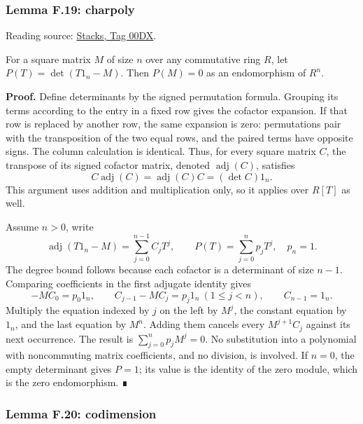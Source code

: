 \documentclass[11pt,a4paper,openany]{report}
\begin{document}
\label{AG-RG-S05-algebra-lemma-charpoly}

\subsubsection{Lemma F.19: charpoly}\label{AG-RG-S05-lemma-f.19-charpoly}

Reading source: \href{https://stacks.math.columbia.edu/tag/00DX}{Stacks, Tag 00DX}.

For a square matrix \(M\) of size \(n\) over any commutative ring \(R\), let \(P(T)=\det(T1_n-M)\). Then \(P(M)=0\) as an endomorphism of \(R^n\).

\textbf{Proof.} Define determinants by the signed permutation formula. Grouping its terms according to the entry in a fixed row gives the cofactor expansion. If that row is replaced by another row, the same expansion is zero: permutations pair with the transposition of the two equal rows, and the paired terms have opposite signs. The column calculation is identical. Thus, for every square matrix \(C\), the transpose of its signed cofactor matrix, denoted \(\operatorname{adj}(C)\), satisfies \[
C\operatorname{adj}(C)=\operatorname{adj}(C)C=(\det C)1_n.
\] This argument uses addition and multiplication only, so it applies over \(R[T]\) as well.

Assume \(n>0\), write \[
\operatorname{adj}(T1_n-M)=\sum_{j=0}^{n-1}C_jT^j,
\qquad P(T)=\sum_{j=0}^n p_jT^j,\quad p_n=1.
\] The degree bound follows because each cofactor is a determinant of size \(n-1\). Comparing coefficients in the first adjugate identity gives \[
-MC_0=p_0 1_n,\qquad
C_{j-1}-MC_j=p_j1_n\ (1\leq j<n),\qquad C_{n-1}=1_n.
\] Multiply the equation indexed by \(j\) on the left by \(M^j\), the constant equation by \(1_n\), and the last equation by \(M^n\). Adding them cancels every \(M^{j+1}C_j\) against its next occurrence. The result is \(\sum_{j=0}^n p_jM^j=0\). No substitution into a polynomial with noncommuting matrix coefficients, and no division, is involved. If \(n=0\), the empty determinant gives \(P=1\); its value is the identity of the zero module, which is the zero endomorphism. ∎

\label{AG-RG-S05-algebra-lemma-codimension}

\subsubsection{Lemma F.20: codimension}\label{AG-RG-S05-lemma-f.20-codimension}
\end{document}
